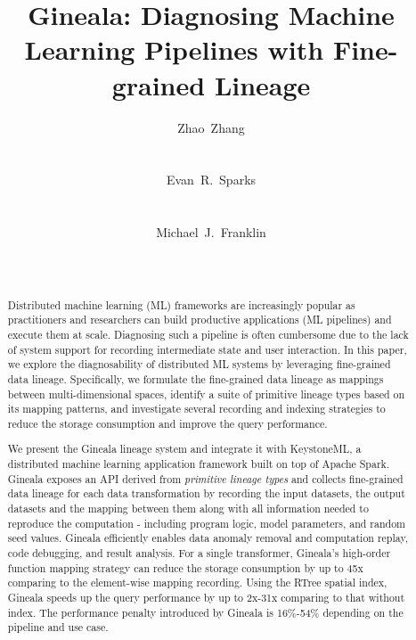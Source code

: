 \documentclass{sig-alternate}
\begin{document}
\title{Gineala: Diagnosing Machine Learning Pipelines with Fine-grained Lineage}

\author{
\alignauthor Zhao~Zhang\\\
       \\
        \\
\alignauthor Evan~R.~Sparks\\\
       \\
       \\
\alignauthor Michael~J.~Franklin\\
       \\
       \\
}

\maketitle

\begin{abstract}
Distributed machine learning (ML) frameworks are increasingly popular as practitioners and researchers 
can build productive applications (ML pipelines) and execute them at scale. 
Diagnosing such a pipeline is often cumbersome due to the lack of system support for
recording intermediate state and user interaction.
In this paper, we explore the diagnosability of distributed ML systems by leveraging fine-grained data lineage. 
Specifically, we formulate the fine-grained data lineage as mappings between multi-dimensional spaces,
identify a suite of primitive lineage types based on its mapping patterns, 
and investigate several recording and indexing strategies to reduce the storage consumption and improve the query performance.

We present the Gineala lineage system and integrate it with KeystoneML, a distributed machine learning
application framework built on top of Apache Spark. 
Gineala exposes an API derived from \emph{primitive lineage types} and collects fine-grained data lineage for each 
data transformation by recording the input datasets, the output datasets and the mapping between them along
with all information needed to reproduce the computation - including program logic, model parameters, and random seed values.
Gineala efficiently enables data anomaly removal and computation replay, code debugging, and result analysis.
For a single transformer, Gineala's high-order function mapping strategy can reduce the storage consumption by up to 
45x comparing to the element-wise mapping recording.
Using the RTree spatial index, Gineala speeds up the query performance by up to 2x-31x comparing to that without index. 
The performance penalty introduced by Gineala is 16\%-54\% depending on the pipeline and use case.

\end{abstract}
\end{document}

